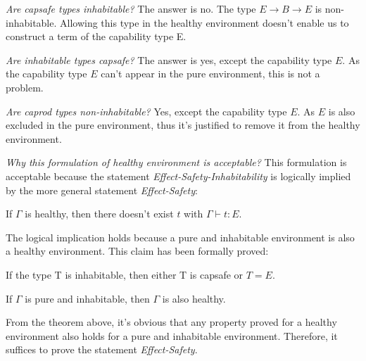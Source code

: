 \emph{Are capsafe types inhabitable?} The answer is no. The type
$E \to B \to E$ is non-inhabitable. Allowing this type in the healthy
environment doesn't enable us to construct a term of the capability
type E.

\emph{Are inhabitable types capsafe?} The answer is yes, except the
capability type $E$. As the capability type $E$ can't appear in the
pure environment, this is not a problem.

\emph{Are caprod types non-inhabitable?} Yes, except the capability
type $E$. As $E$ is also excluded in the pure environment, thus it's
justified to remove it from the healthy environment.


\emph{Why this formulation of healthy environment is acceptable?} This
formulation is acceptable because the statement
\emph{Effect-Safety-Inhabitability} is logically implied by the more
general statement \emph{Effect-Safety}:

\begin{definition}
  If $\Gamma$ is healthy, then there doesn't exist $t$ with
  $\Gamma \vdash t : E$.
\end{definition}

The logical implication holds because a pure and inhabitable
environment is also a healthy environment. This claim has been
formally proved:

\begin{lemma}
  If the type T is inhabitable, then either T is capsafe or $T = E$.
\end{lemma}

\begin{theorem}
  If $\Gamma$ is pure and inhabitable, then $\Gamma$ is also healthy.
\end{theorem}

From the theorem above, it's obvious that any property proved for a
healthy environment also holds for a pure and inhabitable
environment. Therefore, it suffices to prove the statement
\emph{Effect-Safety}.


